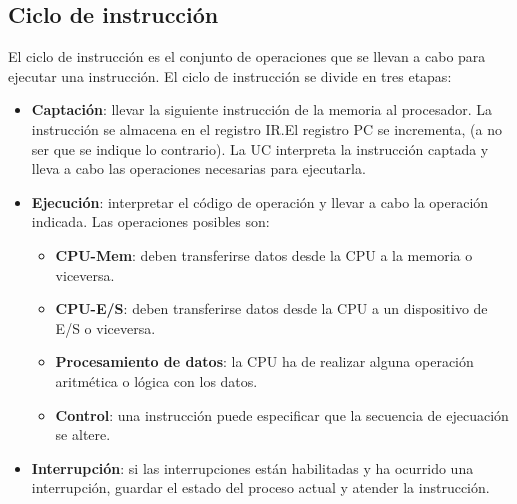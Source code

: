\subsection{Ciclo de instrucción}

El ciclo de instrucción es el conjunto de operaciones que se llevan a cabo para ejecutar una instrucción. El ciclo de instrucción se divide en tres etapas:

\begin{itemize}
  \item \textbf{Captación}: llevar la siguiente instrucción de la memoria al procesador. La instrucción se almacena en el registro IR.\@ El registro PC se incrementa, (a no ser que se indique lo contrario). La UC interpreta la instrucción captada y lleva a cabo las operaciones necesarias para ejecutarla.
  \item \textbf{Ejecución}: interpretar el código de operación y llevar a cabo la operación indicada. Las operaciones posibles son:
  \begin{itemize}
    \item \textbf{CPU-Mem}: deben transferirse datos desde la CPU a la memoria o viceversa.
    \item \textbf{CPU-E/S}: deben transferirse datos desde la CPU a un dispositivo de E/S o viceversa.
    \item \textbf{Procesamiento de datos}: la CPU ha de realizar alguna operación aritmética o lógica con los datos.
    \item \textbf{Control}: una instrucción puede especificar que la secuencia de ejecuación se altere.
  \end{itemize}
  \item \textbf{Interrupción}: si las interrupciones están habilitadas y ha ocurrido una interrupción, guardar el estado del proceso actual y atender la instrucción.
\end{itemize}